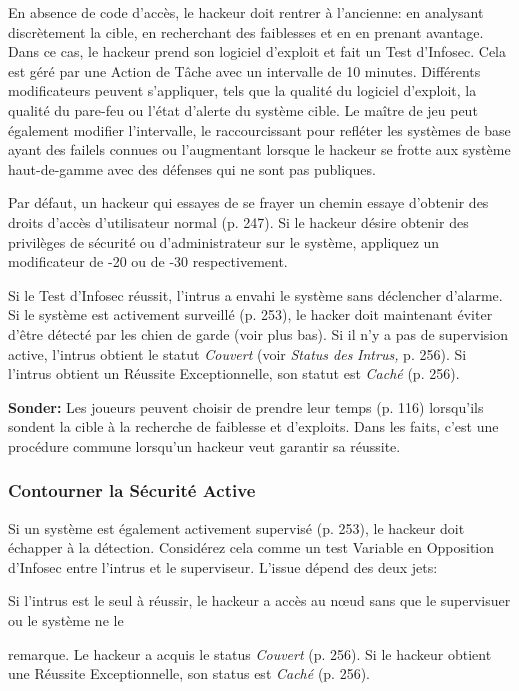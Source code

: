 En absence de code d'accès, le hackeur doit rentrer à l'ancienne: en analysant discrètement la cible, en recherchant des faiblesses et en en prenant avantage. Dans ce cas, le hackeur prend son logiciel d'exploit et fait un Test d'Infosec. Cela est géré par une Action de Tâche avec un intervalle de 10 minutes. Différents modificateurs peuvent s'appliquer, tels que la qualité du logiciel d'exploit, la qualité du pare-feu ou l'état d'alerte du système cible. Le maître de jeu peut également modifier l'intervalle, le raccourcissant pour refléter les systèmes de base ayant des failels connues ou l'augmentant lorsque le hackeur se frotte aux système haut-de-gamme avec des défenses qui ne sont pas publiques. 

Par défaut, un hackeur qui essayes de se frayer un chemin essaye d'obtenir des droits d'accès d'utilisateur normal (p. 247). Si le hackeur désire obtenir des privilèges de sécurité ou d'administrateur sur le système, appliquez un modificateur de -20 ou de -30 respectivement. 

Si le Test d'Infosec réussit, l'intrus a envahi le système sans déclencher d'alarme. Si le système est activement surveillé (p. 253), le hacker doit maintenant éviter d'être détecté par les chien de garde (voir plus bas). Si il n'y a pas de supervision active, l'intrus obtient le statut \textit{Couvert} (voir \textit{Status des }\textit{Intrus,} p. 256). Si l'intrus obtient un Réussite Exceptionnelle, son statut est \textit{Caché} (p. 256). 

\textbf{Sonder:} Les joueurs peuvent choisir de prendre leur temps (p. 116) lorsqu'ils sondent la cible à la recherche de faiblesse et d'exploits. Dans les faits, c'est une procédure commune lorsqu'un hackeur veut garantir sa réussite. 

\subsubsection{Contourner la Sécurité Active} 

Si un système est également activement supervisé (p. 253), le hackeur doit échapper à la détection. Considérez cela comme un test Variable en Opposition d'Infosec entre l'intrus et le superviseur. L'issue dépend des deux jets: 

Si l'intrus est le seul à réussir, le hackeur a accès au nœud sans que le supervisuer ou le système ne le 

remarque. Le hackeur a acquis le status \textit{Couvert} (p. 256). Si le hackeur obtient une Réussite Exceptionnelle, son status est \textit{Caché} (p. 256). 

